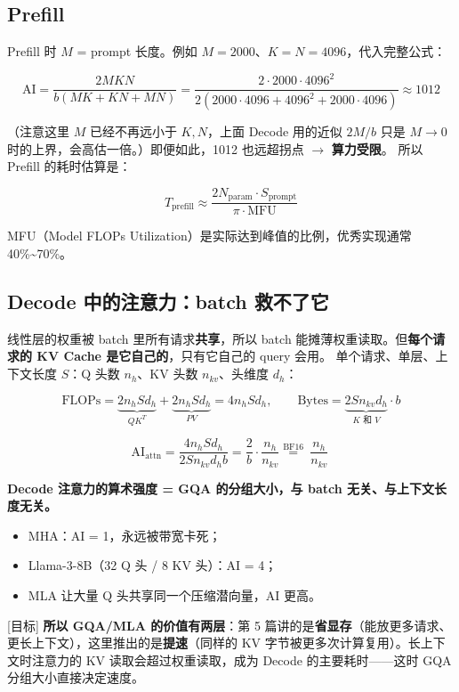 \subsection{Prefill}

Prefill 时 $M$ = prompt 长度。例如 $M = 2000$、$K = N = 4096$，代入完整公式：

\[
\text{AI} = \frac{2MKN}{b(MK + KN + MN)} = \frac{2 \cdot 2000 \cdot 4096^2}{2(2000 \cdot 4096 + 4096^2 + 2000 \cdot 4096)} \approx 1012
\]

（注意这里 $M$ 已经不再远小于 $K, N$，上面 Decode 用的近似 $2M/b$ 只是 $M \to 0$ 时的上界，会高估一倍。）即便如此，1012 也远超拐点 $\rightarrow$ \textbf{算力受限}。
所以 Prefill 的耗时估算是：

\[
T_{\text{prefill}} \approx \frac{2 N_{\text{param}} \cdot S_{\text{prompt}}}{\pi \cdot \text{MFU}}
\]

MFU（Model FLOPs Utilization）是实际达到峰值的比例，优秀实现通常 40\%\textasciitilde{}70\%。

\subsection{Decode 中的注意力：batch 救不了它}

线性层的权重被 batch 里所有请求\textbf{共享}，所以 batch 能摊薄权重读取。但\textbf{每个请求的 KV Cache 是它自己的}，只有它自己的 query 会用。
单个请求、单层、上下文长度 $S$：Q 头数 $n_h$、KV 头数 $n_{kv}$、头维度 $d_h$：

\[
\text{FLOPs} = \underbrace{2 n_h S d_h}_{QK^T} + \underbrace{2 n_h S d_h}_{PV} = 4 n_h S d_h, \qquad \text{Bytes} = \underbrace{2 S n_{kv} d_h}_{K \text{ 和 } V} \cdot b
\]

\[
\text{AI}_{\text{attn}} = \frac{4 n_h S d_h}{2 S n_{kv} d_h b} = \frac{2}{b} \cdot \frac{n_h}{n_{kv}} \overset{\text{BF16}}{=} \boxed{\ \frac{n_h}{n_{kv}}\ }
\]

\textbf{Decode 注意力的算术强度 = GQA 的分组大小，与 batch 无关、与上下文长度无关。}
\begin{itemize}
  \item MHA：AI = 1，永远被带宽卡死；
  \item Llama-3-8B（32 Q 头 / 8 KV 头）：AI = 4；
  \item MLA 让大量 Q 头共享同一个压缩潜向量，AI 更高。
\end{itemize}

\begin{warningBox}[避坑指南与核心警示]
{}[目标] \textbf{所以 GQA/MLA 的价值有两层}：第 5 篇讲的是\textbf{省显存}（能放更多请求、更长上下文），这里推出的是\textbf{提速}（同样的 KV 字节被更多次计算复用）。长上下文时注意力的 KV 读取会超过权重读取，成为 Decode 的主要耗时——这时 GQA 分组大小直接决定速度。
\end{warningBox}

